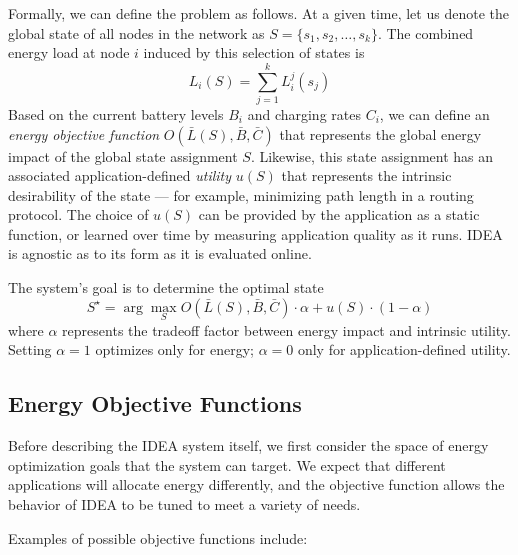 Formally, we can define the problem as follows. At a given time, let us
denote the global state of all nodes in the network as $S = \{ s_1, s_2,
\ldots, s_k \}$. The combined energy load at node $i$ induced by this
selection of states is \[ L_i(S) = \sum_{j=1}^k L_i^j(s_j) \] Based on the
current battery levels $B_i$ and charging rates $C_i$, we can define an
\textit{energy objective function} $O(\bar{L}(S), \bar{B}, \bar{C})$ that
represents the global energy impact of the global state assignment $S$.
Likewise, this state assignment has an associated application-defined
\textit{utility} $u(S)$ that represents the intrinsic desirability of the
state --- for example, minimizing path length in a routing protocol. The
choice of $u(S)$ can be provided by the application as a static function, or
learned over time by measuring application quality as it runs. IDEA is
agnostic as to its form as it is evaluated online. 

The system's goal is to determine the optimal state \[ S^\star = \arg
\max_{S} O(\bar{L}(S), \bar{B}, \bar{C}) \cdot \alpha + u(S) \cdot
(1-\alpha)\] where $\alpha$ represents the tradeoff factor between energy
impact and intrinsic utility. Setting $\alpha=1$ optimizes only for energy;
$\alpha=0$ only for application-defined utility. 

\subsection{Energy Objective Functions}
\label{subsec-energyobjectivefunctions}

Before describing the IDEA system itself, we first consider the space of
energy optimization goals that the system can target. We expect that
different applications will allocate energy differently, and the objective
function allows the behavior of IDEA to be tuned to meet a variety of needs. 

Examples of possible objective functions include:

